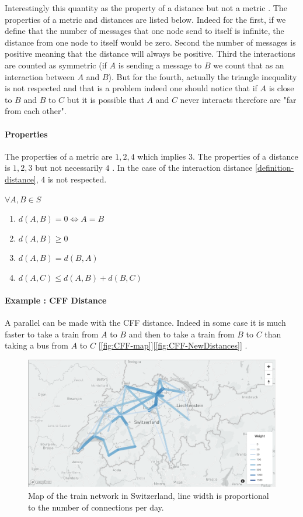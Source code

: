 \documentclass[a4paper,11pt,oneside]{report}
\begin{document}
Interestingly this quantity as the property of a distance but not a metric
\cite{Greenhoe2016}. The properties of a metric and distances are listed below.  Indeed for the first, if we define that the number of
messages that one node send to itself is infinite, the distance from one node to itself would be zero. Second the number of
messages is positive meaning that the distance will always be positive. Third
the interactions are counted as symmetric (if $A$ is sending a message to $B$
we count that as an interaction between $A$ and $B$). But for the fourth, actually the triangle
inequality is not respected and that is a problem indeed one should notice that
if $A$ is close to $B$ and $B$ to $C$ but it is possible that $A$ and $C$ never
interacts therefore are "far from each other".  

\paragraph{Properties}
The properties of a metric are $1, 2, 4$ which implies $3$. The properties of a
distance is $1,2,3$ but not necessarily $4$  \cite{Greenhoe2016}. In the case of
the interaction distance \autoref{definition-distance}, $4$ is not respected.

$\forall A,B \in S$
\begin{enumerate}
\item $d(A,B) = 0  \Leftrightarrow A = B$
\item $d(A,B) \geq 0$
\item $d(A,B) = d(B,A)$
 \color{red} \item$d(A, C) \leq d(A,B) + d(B,C)$ \color{black}
\end{enumerate}

\paragraph{Example :  CFF Distance}
A parallel can be made with the CFF distance. Indeed in some case it is much
faster to take a train from $A$ to $B$ and then to take a train from $B$ to $C$
than taking a bus from $A$ to $C$ [\autoref{fig:CFF-map}][\autoref{fig:CFF-NewDistances}] . 

\begin{figure}[!h] 
\centering
\includegraphics[width=450pt]{figures/CFF-map}
\caption{Map of the train network in Switzerland, line width is proportional to
    the number of connections per day.} \label{fig:CFF-map}
\end{figure}
\end{document}
